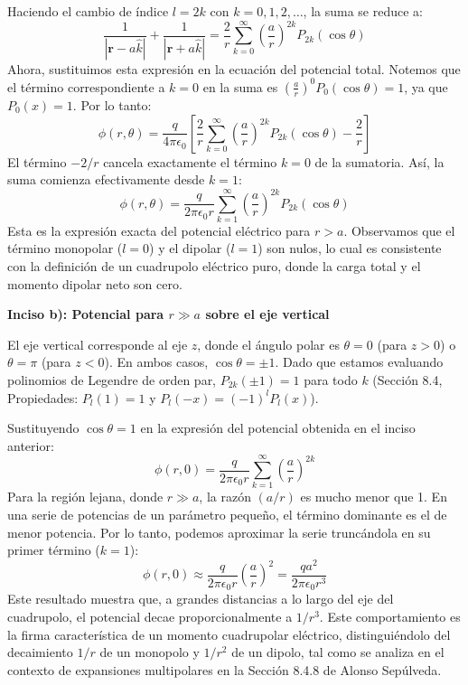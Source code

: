 \documentclass[a4paper]{article}
\begin{document}
Haciendo el cambio de índice $l = 2k$ con $k = 0, 1, 2, \dots$, la suma se reduce a:
$$
\frac{1}{|\mathbf{r} - a\hat{k}|} + \frac{1}{|\mathbf{r} + a\hat{k}|} = \frac{2}{r} \sum_{k=0}^{\infty} \left(\frac{a}{r}\right)^{2k} P_{2k}(\cos\theta)
$$
Ahora, sustituimos esta expresión en la ecuación del potencial total. Notemos que el término correspondiente a $k=0$ en la suma es $\left(\frac{a}{r}\right)^0 P_0(\cos\theta) = 1$, ya que $P_0(x) = 1$. Por lo tanto:
$$
\phi(r, \theta) = \frac{q}{4\pi\epsilon_0} \left[ \frac{2}{r} \sum_{k=0}^{\infty} \left(\frac{a}{r}\right)^{2k} P_{2k}(\cos\theta) - \frac{2}{r} \right]
$$
El término $-2/r$ cancela exactamente el término $k=0$ de la sumatoria. Así, la suma comienza efectivamente desde $k=1$:
$$
\phi(r, \theta) = \frac{q}{2\pi\epsilon_0 r} \sum_{k=1}^{\infty} \left(\frac{a}{r}\right)^{2k} P_{2k}(\cos\theta)
$$
Esta es la expresión exacta del potencial eléctrico para $r > a$. Observamos que el término monopolar ($l=0$) y el dipolar ($l=1$) son nulos, lo cual es consistente con la definición de un cuadrupolo eléctrico puro, donde la carga total y el momento dipolar neto son cero.

\textbf{Inciso b): Potencial para $r \gg a$ sobre el eje vertical}

El eje vertical corresponde al eje $z$, donde el ángulo polar es $\theta = 0$ (para $z > 0$) o $\theta = \pi$ (para $z < 0$). En ambos casos, $\cos\theta = \pm 1$. Dado que estamos evaluando polinomios de Legendre de orden par, $P_{2k}(\pm 1) = 1$ para todo $k$ (Sección 8.4, Propiedades: $P_l(1) = 1$ y $P_l(-x) = (-1)^l P_l(x)$).

Sustituyendo $\cos\theta = 1$ en la expresión del potencial obtenida en el inciso anterior:
$$
\phi(r, 0) = \frac{q}{2\pi\epsilon_0 r} \sum_{k=1}^{\infty} \left(\frac{a}{r}\right)^{2k}
$$
Para la región lejana, donde $r \gg a$, la razón $(a/r)$ es mucho menor que 1. En una serie de potencias de un parámetro pequeño, el término dominante es el de menor potencia. Por lo tanto, podemos aproximar la serie truncándola en su primer término ($k=1$):
$$
\phi(r, 0) \approx \frac{q}{2\pi\epsilon_0 r} \left(\frac{a}{r}\right)^2 = \frac{q a^2}{2\pi\epsilon_0 r^3}
$$
Este resultado muestra que, a grandes distancias a lo largo del eje del cuadrupolo, el potencial decae proporcionalmente a $1/r^3$. Este comportamiento es la firma característica de un momento cuadrupolar eléctrico, distinguiéndolo del decaimiento $1/r$ de un monopolo y $1/r^2$ de un dipolo, tal como se analiza en el contexto de expansiones multipolares en la Sección 8.4.8 de Alonso Sepúlveda.
\end{document}
